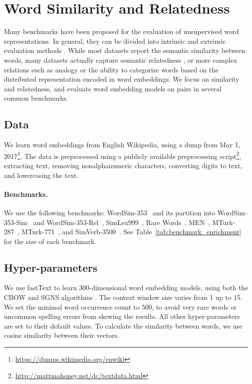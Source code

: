 \documentclass[11pt,a4paper]{article}
\begin{document}
    \section{Word Similarity and Relatedness}\label{sec:benchmarks}
    
    Many benchmarks have been proposed for the evaluation of unsupervised word
    representations.
    In general, they can be divided into intrinsic and extrinsic evaluation methods
    \cite{schnabel2015evaluation,chiu2016intrinsic,jastrzebski2017evaluate,alshargi2018concept2vec,bakarov2018survey}.
    While most datasets report the semantic similarity between words,
    many datasets actually capture semantic relatedness
    \cite{hill2015simlex,avraham2016improving},
    or more complex relations such as analogy or the ability to categorize
    words based on the distributed representation encoded in word embeddings.
    We focus on similarity and relatedness, and evaluate word embedding models
    on pairs in several common benchmarks.
    
    \subsection{Data}\label{sec:data}
    We learn word embeddings from English Wikipedia,
    using a dump from May 1, 2017\footnote{\url{https://dumps.wikimedia.org/enwiki}}.
    The data is preprocessed using a publicly available preprocessing
    script\footnote{\url{http://mattmahoney.net/dc/textdata.html}},
    extracting text, removing nonalphanumeric characters,
    converting digits to text, and lowercasing the text.
    
    \paragraph{Benchmarks.}
    
    We use the following benchmarks:
     WordSim-353~\cite{finkelstein2001placing} and its partition into
     WordSim-353-Sim~\cite{agirre2009study} and
     WordSim-353-Rel~\cite{zesch2008using},
     SimLex999~\cite{hill2015simlex},
     Rare Words~\cite[RW; ][]{luong2013better},
     MEN~\cite{bruni2012distributional},
     MTurk-287~\cite{radinsky2011word},
     MTurk-771~\cite{halawi2012large}, and
     SimVerb-3500~\cite{Gerz2016emnlp}.
    See Table~\ref{tab:benchmark_enrichment} for the size of each benchmark.
    
    \subsection{Hyper-parameters}\label{sec:hyperparams}
    We use fastText \cite{bojanowski2016enriching} to learn
    300-dimensional word embedding models,
    using both the CBOW and SGNS algorithms \cite{mikolov2013efficient}.
    The context window size varies from 1 up to 15.
    We set the minimal word occurrence count to 500, to avoid
    very rare words or uncommon spelling errors from skewing the results.
    All other hyper-parameters are set to their default values.
    To calculate the similarity between words, we use cosine similarity
    between their vectors.
    
\end{document}
